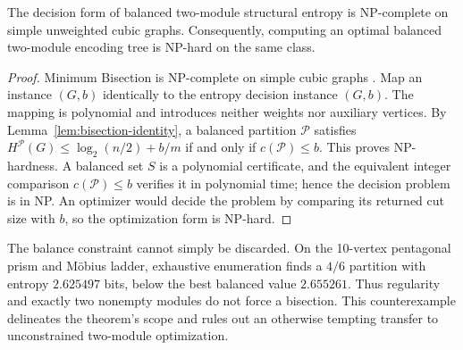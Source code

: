\begin{theorem}
\label{thm:balanced-hardness}
The decision form of balanced two-module structural entropy is NP-complete on
simple unweighted cubic graphs. Consequently, computing an optimal balanced
two-module encoding tree is NP-hard on the same class.
\end{theorem}

\begin{proof}
Minimum Bisection is NP-complete on simple cubic graphs
\cite{bui1987graph}. Map an instance $(G,b)$ identically to the entropy
decision instance $(G,b)$. The mapping is polynomial and introduces neither
weights nor auxiliary vertices. By Lemma~\ref{lem:bisection-identity}, a
balanced partition $\mathcal P$ satisfies
$H^{\mathcal P}(G)\leq\log_2(n/2)+b/m$ if and only if
$c(\mathcal P)\leq b$. This proves NP-hardness. A balanced set $S$ is a
polynomial certificate, and the equivalent integer comparison
$c(\mathcal P)\leq b$ verifies it in polynomial time; hence the decision
problem is in NP. An optimizer would decide the problem by comparing its
returned cut size with $b$, so the optimization form is NP-hard.
\end{proof}

The balance constraint cannot simply be discarded. On the 10-vertex
pentagonal prism and M\"obius ladder, exhaustive enumeration finds a $4/6$
partition with entropy $2.625497$ bits, below the best balanced value
$2.655261$. Thus regularity and exactly two nonempty modules do not force a
bisection. This counterexample delineates the theorem's scope and rules out an
otherwise tempting transfer to unconstrained two-module optimization.
